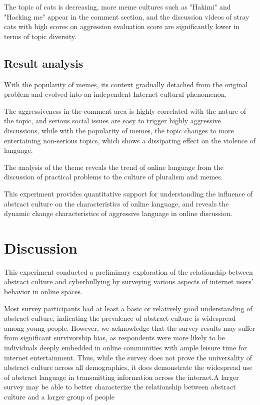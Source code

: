 \documentclass[12pt,a4paper]{ctexart}
\theoremstyle{MyLineTheoremStyle}
\theoremstyle{MyBlockTheoremStyle}
\theoremstyle{MySubsubsectionStyle}
\begin{document}
The topic of cats is decreasing, more meme cultures such as "Hakimi" and "Hacking me" appear in the comment section, and the discussion videos of stray cats with high scores on aggression evaluation score are significantly lower in terms of topic diversity.

\subsection{Result analysis}

With the popularity of memes, its context gradually detached from the original problem and evolved into an independent Internet cultural phenomenon.

The aggressiveness in the comment area is highly correlated with the nature of the topic, and serious social issues are easy to trigger highly aggressive discussions, while with the popularity of memes, the topic changes to more entertaining non-serious topics, which shows a dissipating effect on the violence of language.

The analysis of the theme reveals the trend of online language from the discussion of practical problems to the culture of pluralism and memes.

This experiment provides quantitative support for understanding the influence of abstract culture on the characteristics of online language, and reveals the dynamic change characteristics of aggressive language in online discussion.

\section{Discussion}

This experiment conducted a preliminary exploration of the relationship between abstract culture and cyberbullying by surveying various aspects of internet users' behavior in online spaces.

Most survey participants had at least a basic or relatively good understanding of abstract culture, indicating the prevalence of abstract culture is widespread among young people. However, we acknowledge that the survey results may suffer from significant survivorship bias, as respondents were more likely to be individuals deeply embedded in online communities with ample leisure time for internet entertainment. Thus, while the survey does not prove the universality of abstract culture across all demographics, it does demonstrate the widespread use of abstract language in transmitting information across the internet.A larger survey may be able to better characterize the relationship between abstract culture and a larger group of people
\end{document}
